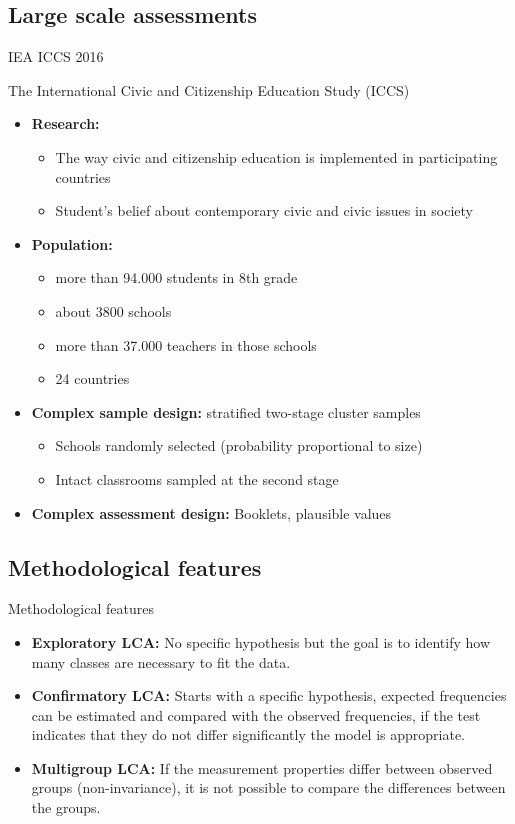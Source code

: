 \documentclass[11pt,t]{beamer}
\begin{document}
\subsection{Large scale assessments}
\begin{frame}[c,plain]{IEA ICCS 2016}

The International Civic and Citizenship Education Study (ICCS)

\begin{itemize}
	\item \textbf{Research:} 
	\begin{itemize}
		\item The way civic and citizenship education is implemented in participating countries
		\item Student's belief about contemporary civic and civic issues in society
	\end{itemize}
	\item \textbf{Population:}  
	\begin{itemize}
		\item more than 94.000 students in 8th grade 
		\item about 3800 schools 
		\item more than 37.000 teachers in those schools
		\item 24 countries
	\end{itemize}
	\item \textbf{Complex sample design:}  stratified two-stage cluster samples
	\begin{itemize}
		\item Schools randomly selected (probability proportional to size)
		\item Intact classrooms sampled at the second stage
	\end{itemize}
	\item \textbf{Complex assessment design:} Booklets, plausible values
\end{itemize}
\end{frame}


\subsection{Methodological features}
\begin{frame}[c,plain]{Methodological features}
\vspace{-11pt}
	\begin{itemize}
		\item \textbf{Exploratory LCA:} No specific hypothesis but the goal is to identify how many classes are necessary to fit the data.  
		\item \textbf{Confirmatory LCA:} Starts with a specific hypothesis, expected frequencies can be estimated and compared with the observed frequencies, if the test indicates that they do not differ significantly the model is appropriate.  
\vspace{11pt}
		\item \textbf{Multigroup LCA:} 	If the measurement properties differ between observed groups (non-invariance), it is not possible to compare the differences between the groups. 
	\end{itemize}
\end{frame}
\end{document}
